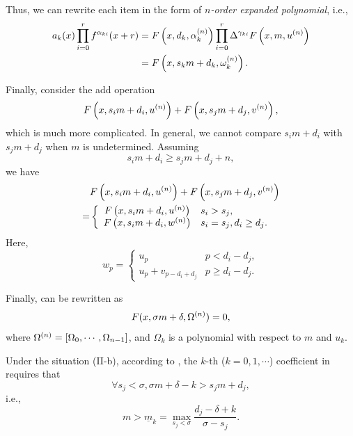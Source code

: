 Thus, we can rewrite each item in the form of \emph{$n$-order expanded polynomial}, i.e.,
\begin{equation}
\begin{split}
a_k(x)\prod_{i=0}^r{f^{\alpha_{ki}}(x+r)}&=F\left(x,d_k,\alpha_k^{(n)}\right)\prod_{i=0}^r{\Delta^{\gamma_{ki}}F\left(x,m,u^{(n)}\right)} \\
&= F\left(x,s_k m+d_k, \omega_k^{(n)}\right) .
\end{split}
\end{equation}

Finally, consider the add operation
\begin{equation}
F\left(x,s_i m+d_i,u^{(n)}\right)+F\left(x,s_j m+d_j,v^{(n)}\right),
\end{equation}
which is much more complicated. In general, we cannot compare $s_i m + d_i$ with $s_j m + d_j$ when $m$ is undetermined. Assuming
\begin{equation}
s_i m+d_i\ge s_j m+d_j+n, \label{cond_add}
\end{equation}
we have
\begin{equation}
\begin{split}
&F\left(x,s_i m+d_i,u^{(n)}\right)+F\left(x,s_j m+d_j,v^{(n)}\right) \\
=&\left\{
\begin{array}{cl}
    F\left(x,s_i m+d_i,u^{(n)}\right) & s_i>s_j ,            \\
    F\left(x,s_i m+d_i,w^{(n)}\right) & s_i=s_j,d_i\ge d_j .
\end{array}
\right.
\end{split}
\end{equation}
Here,
\begin{equation}
w_p=\left\{
\begin{array}{cl}
u_p               & p<d_i-d_j ,   \\
u_p+v_{p-d_i+d_j} & p\ge d_i-d_j.
\end{array}
\right.
\end{equation}

Finally,  can be rewritten as
\begin{equation}
F(x,\sigma m + \delta,\Omega^{(n)})=0,
\label{eq-np}
\end{equation}
where $\Omega^{(n)}=\left[\Omega_0,\cdots,\Omega_{n-1}\right]$, and $\Omega_k$ is a polynomial with respect to $m$ and $u_k$.

Under the situation (II-b), according to , the $k$-th ($k=0,1,\cdots$) coefficient in  requires that
\begin{equation}
\forall s_j<\sigma, \sigma m + \delta - k > s_j m + d_j,
\end{equation}
i.e.,
\begin{equation}
m > \underline{m}_k=\underset{s_j<\sigma}{\max}{\frac{d_j-\delta+k}{\sigma-s_j}}.
\end{equation}

